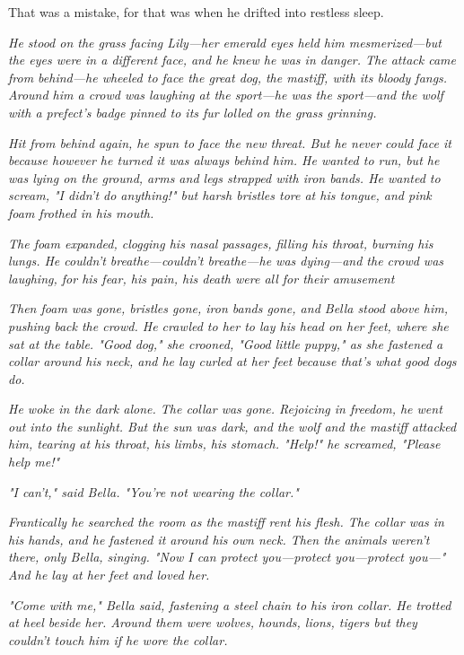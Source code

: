 That was a mistake, for that was when he drifted into restless sleep.

\sbreak

\emph{He stood on the grass facing Lily—her emerald eyes held him mesmerized—but the eyes were in a different face, and he knew he was in danger. The attack came from behind—he wheeled to face the great dog, the mastiff, with its bloody fangs. Around him a crowd was laughing at the sport—he was the sport—and the wolf with a prefect's badge pinned to its fur lolled on the grass grinning.}

\emph{Hit from behind again, he spun to face the new threat. But he never could face it because however he turned it was always behind him. He wanted to run, but he was lying on the ground, arms and legs strapped with iron bands. He wanted to scream, "I didn't do anything!" but harsh bristles tore at his tongue, and pink foam frothed in his mouth.}

\emph{The foam expanded, clogging his nasal passages, filling his throat, burning his lungs. He couldn't breathe—couldn't breathe—he was dying—and the crowd was laughing, for his fear, his pain, his death were all for their amusement{\el}}

\emph{Then foam was gone, bristles gone, iron bands gone, and Bella stood above him, pushing back the crowd. He crawled to her to lay his head on her feet, where she sat at the table. "Good dog," she crooned, "Good little puppy," as she fastened a collar around his neck, and he lay curled at her feet because that's what good dogs do.}

\emph{He woke in the dark alone. The collar was gone. Rejoicing in freedom, he went out into the sunlight. But the sun was dark, and the wolf and the mastiff attacked him, tearing at his throat, his limbs, his stomach. "Help!" he screamed, "Please help me!"}

\emph{"I can't," said Bella. "You're not wearing the collar."}

\emph{Frantically he searched the room as the mastiff rent his flesh. The collar was in his hands, and he fastened it around his own neck. Then the animals weren't there, only Bella, singing. "Now I can protect you—protect you—protect you—" And he lay at her feet and loved her.}

\emph{"Come with me," Bella said, fastening a steel chain to his iron collar. He trotted at heel beside her. Around them were wolves, hounds, lions, tigers{\el} but they couldn't touch him if he wore the collar.}

